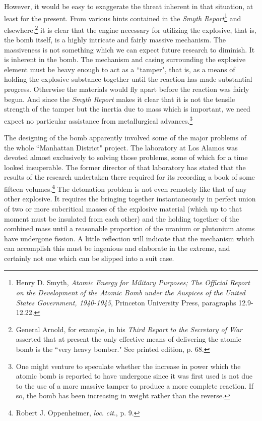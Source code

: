 However, it would be easy to exaggerate the threat inherent in that situation, at least for the present. From various hints contained in the \emph{Smyth Report}\footnote{Henry D. Smyth, \textit{Atomic Energy for Military Purposes; The Official Report on the Development of the Atomic Bomb under the Auspices of the United States Government, 1940-1945}, Princeton University Press, paragraphs 12.9-12.22.} and elsewhere,\footnote{General Arnold, for example, in his \textit{Third Report to the Secretary of War} asserted that at present the only effective means of delivering the atomic bomb is the ``very heavy bomber." See printed edition, p. 68.} it is clear that the engine necessary for utilizing the explosive, that is, the bomb itself, is a highly intricate and fairly massive mechanism. The massiveness is not something which we can expect future research to diminish. It is inherent in the bomb. The mechanism and casing surrounding the explosive element must be heavy enough to act as a ``tamper", that is, as a means of holding the explosive substance together until the reaction has made substantial progress. Otherwise the materials would fly apart before the reaction was fairly begun. And since the \emph{Smyth Report} makes it clear that it is not the tensile strength of the tamper but the inertia due to mass which is important, we need expect no particular assistance from metallurgical advances.\footnote{One might venture to speculate whether the increase in power which the atomic bomb is reported to have undergone since it was first used is not due to the use of a more massive tamper to produce a more complete reaction. If so, the bomb has been increasing in weight rather than the reverse.}

The designing of the bomb apparently involved some of the major problems of the whole ``Manhattan District" project. The laboratory at Los Alamos was devoted almost exclusively to solving those problems, some of which for a time looked insuperable. The former director of that laboratory has stated that the results of the research undertaken there required for its recording a book of some fifteen volumes.\footnote{Robert J. Oppenheimer, \emph{loc}. \emph{cit}., p. 9.} The detonation problem is not even remotely like that of any other explosive. It requires the bringing together instantaneously in perfect union of two or more subcritical masses of the explosive material (which up to that moment must be insulated from each other) and the holding together of the combined mass until a reasonable proportion of the uranium or plutonium atoms have undergone fission. A little reflection will indicate that the mechanism which can accomplish this must be ingenious and elaborate in the extreme, and certainly not one which can be slipped into a suit case.

